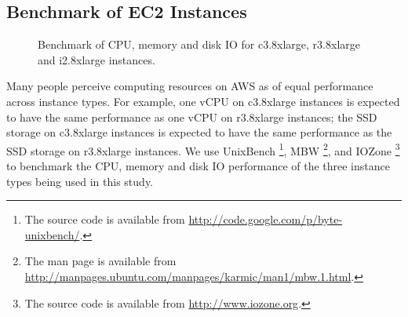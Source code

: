 \subsection{Benchmark of EC2 Instances}
\label{sec:subsec:ec2_benchmark}

\begin{figure}[t!]
\centering
\vspace{-10pt}
 \hspace{5pt}
  \hspace{5pt}
  \caption{Benchmark of CPU, memory and disk IO for c3.8xlarge, r3.8xlarge and i2.8xlarge instances.} 
  \label{fig:instance_benchmark} 
\end{figure}


Many people perceive computing resources on AWS as of equal performance across instance types. For example, one vCPU on c3.8xlarge instances is expected to have the same performance as one vCPU on r3.8xlarge instances; the SSD storage on c3.8xlarge instances is expected to have the same performance as the SSD storage on r3.8xlarge instances. We use UnixBench \footnote{The source code is available from \url{http://code.google.com/p/byte-unixbench/}.}, MBW \footnote{The man page is available from \url{http://manpages.ubuntu.com/manpages/karmic/man1/mbw.1.html}.}, and IOZone \footnote{The source code is available from \url{http://www.iozone.org}.} to benchmark the CPU, memory and disk IO performance of the three instance types being used in this study. 

